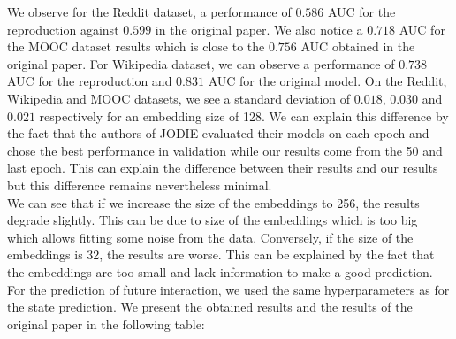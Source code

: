 We observe for the Reddit dataset, a performance of $0.586$ AUC for the reproduction against $0.599$ in the original paper. We also notice a  $0.718$ AUC  for the MOOC dataset results which is close to the $0.756$ AUC obtained in the original paper. For Wikipedia dataset, we can observe a performance of $0.738$ AUC for the reproduction and $0.831$ AUC for the original model. On the Reddit, Wikipedia and MOOC datasets, we see a standard deviation of $0.018$, $0.030$ and $0.021$ respectively for an embedding size of 128. We can explain this difference by the fact that the authors of JODIE evaluated their models on each epoch and chose the best performance in validation while our results come from the 50 and last epoch. This can explain the difference between their results and our results but this difference remains nevertheless minimal.\\
We can see that if we increase the size of the embeddings to 256, the results degrade slightly. This can be due to size of the embeddings which is too big which allows fitting some noise from the data. Conversely, if the size of the embeddings is 32, the results are worse. This can be explained by the fact that the embeddings are too small and lack information to make a good prediction.\\

For the prediction of future interaction, we used the same hyperparameters as for the state prediction. We present the obtained results and the results of the original paper in the following table:



